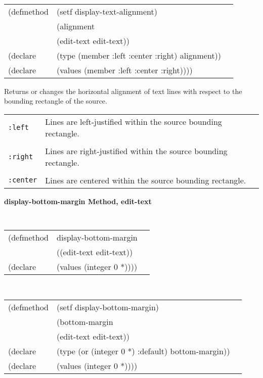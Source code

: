 \begin{flushright} \parbox[t]{6.125in}{
\tt
\begin{tabular}{lll}
\raggedright
(defmethod & (setf display-text-alignment) & \\
         & (alignment \\
         & (edit-text  edit-text)) \\
(declare &(type (member :left :center :right)  alignment))\\
(declare & (values (member :left :center :right))))
\end{tabular}
\rm}
\end{flushright}

\begin{flushright} \parbox[t]{6.125in}{
Returns or changes the horizontal alignment of text lines with respect to the
bounding rectangle of the source.

\begin{center}
\begin{tabular}{ll}
{\tt :left} & Lines are left-justified within the source bounding rectangle.\\ \\
{\tt :right} & Lines are right-justified within the source bounding rectangle.\\ \\
{\tt :center} & Lines are centered within the source bounding rectangle.\\
\end{tabular}
\end{center}}
\end{flushright}


{\samepage  
{\large {\bf display-bottom-margin \hfill Method, edit-text}}
\begin{flushright} \parbox[t]{6.125in}{
\tt
\begin{tabular}{lll}
\raggedright
(defmethod & display-bottom-margin & \\
& ((edit-text  edit-text)) \\
(declare & (values (integer 0 *))))
\end{tabular}
\rm

}\end{flushright}}

\begin{flushright} \parbox[t]{6.125in}{
\tt
\begin{tabular}{lll}
\raggedright
(defmethod & (setf display-bottom-margin) & \\
         & (bottom-margin \\
         & (edit-text  edit-text)) \\
(declare &(type (or (integer 0 *) :default)  bottom-margin))\\
(declare & (values (integer 0 *))))
\end{tabular}
\rm}
\end{flushright}

